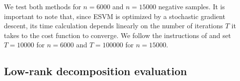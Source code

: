 We test both methods for $n=6000$ and $n=15000$ negative samples. It is important to note that, since ESVM is optimized by a stochastic gradient descent, its time calculation depends linearly on the number of iterations $T$ it takes to the cost function to converge. We follow the instructions of \cite{ZePe15} and set $T=10000$ for $n=6000$ and $T=100000$ for $n=15000$.



\subsection{Low-rank decomposition evaluation}


